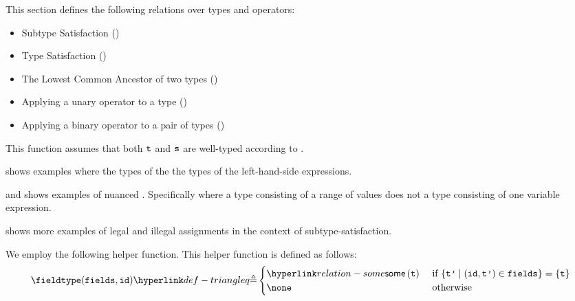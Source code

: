 This section defines the following relations over types and operators:
\begin{itemize}
  \item Subtype Satisfaction ()
  \item Type Satisfaction ()
  \item The Lowest Common Ancestor of two types ()
  \item Applying a unary operator to a type ()
  \item Applying a binary operator to a pair of types ()
\end{itemize}


This function assumes that both $\texttt{t}$ and $\texttt{s}$ are well-typed according to .

 shows examples
where the types of the \rhsexpressions{} \subtypesatisfyterm{}
the types of the left-hand-side expressions.
\pagebreak
{}

 and 
shows examples of nuanced \typingerrorsterm.
Specifically where a type consisting of a range of values does not \subtypesatisfyterm{}
a type consisting of one variable expression.

 shows more examples of legal and illegal assignments in the context
of subtype-satisfaction.

We employ the following helper function.
This helper function is defined as follows:
\[
  \fieldtype(\fields, \id) \triangleq
  \begin{cases}
  \some{\vt}  & \text{ if }\{ \vtp \;|\; (\id,\vtp) \in \fields\} = \{\vt\}\\
  \none & \text{ otherwise}
  \end{cases}
\]


